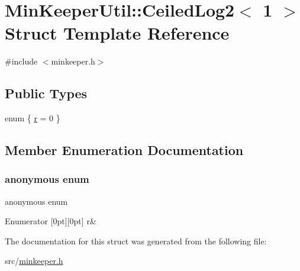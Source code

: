 \hypertarget{structMinKeeperUtil_1_1CeiledLog2_3_011_01_4}{}\section{Min\+Keeper\+Util\+:\+:Ceiled\+Log2$<$ 1 $>$ Struct Template Reference}
\label{structMinKeeperUtil_1_1CeiledLog2_3_011_01_4}


{\ttfamily \#include $<$minkeeper.\+h$>$}

\subsection*{Public Types}
\begin{DoxyCompactItemize}
\item 
enum \{ \hyperlink{structMinKeeperUtil_1_1CeiledLog2_3_011_01_4_aa5d5d5cc1108d764e0f2ac3dcea396b9a9f21475653eaeb44a702f54f2fdead04}{r} = 0
 \}
\end{DoxyCompactItemize}


\subsection{Member Enumeration Documentation}
\mbox{\label{structMinKeeperUtil_1_1CeiledLog2_3_011_01_4_aa5d5d5cc1108d764e0f2ac3dcea396b9}} 
\subsubsection{\texorpdfstring{anonymous enum}{anonymous enum}}
{\footnotesize\ttfamily anonymous enum}

\begin{DoxyEnumFields}{Enumerator}
[0pt][0pt]{}\mbox{\label{structMinKeeperUtil_1_1CeiledLog2_3_011_01_4_aa5d5d5cc1108d764e0f2ac3dcea396b9a9f21475653eaeb44a702f54f2fdead04}} 
r&\\
\hline

\end{DoxyEnumFields}


The documentation for this struct was generated from the following file\+:\begin{DoxyCompactItemize}
\item 
src/\hyperlink{minkeeper_8h}{minkeeper.\+h}\end{DoxyCompactItemize}
